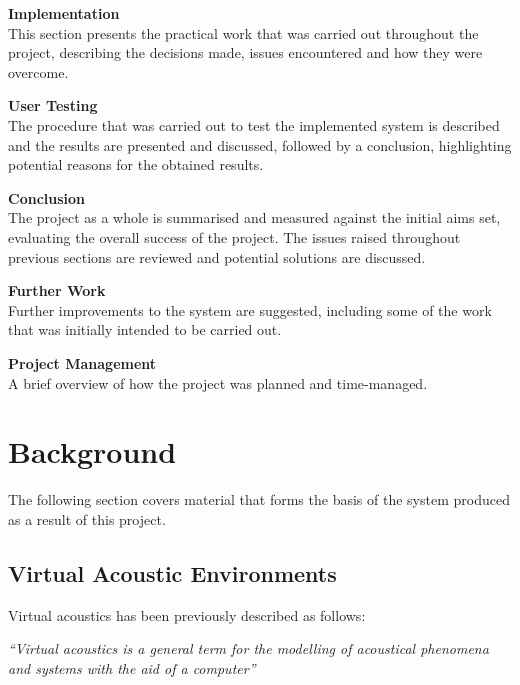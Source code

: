 \documentclass[../../main.tex]{subfiles}
\begin{document}
	\textbf{Implementation}\\
		This section presents the practical work that was carried out throughout the project, describing the decisions made, issues encountered and how they were overcome.

	\textbf{User Testing}\\	
		The procedure that was carried out to test the implemented system is described and the results are presented and discussed, followed by a conclusion, highlighting potential reasons for the obtained results.

	\textbf{Conclusion}\\
		The project as a whole is summarised and measured against the initial aims set, evaluating the overall success of the project. The issues raised throughout previous sections are reviewed and potential solutions are discussed.

	\textbf{Further Work}\\
		Further improvements to the system are suggested, including some of the work that was initially intended to be carried out.

	\textbf{Project Management}\\
		A brief overview of how the project was planned and time-managed.


\pagebreak
{}
\section{Background}
	
	The following section covers material that forms the basis of the system produced as a result of this project.

	\subsection{Virtual Acoustic Environments}

		 Virtual acoustics has been previously described \cite{Huopaniemi2000} as follows: 

		 \vspace{5mm}
		 \begin{center}
		 \begin{minipage}{0.5\textwidth}
		 \textit{``Virtual acoustics is a general term for the modelling of acoustical phenomena and systems with the aid of a computer''}
		 \end{minipage}
		 \end{center}
		 \vspace{5mm}
\end{document}
